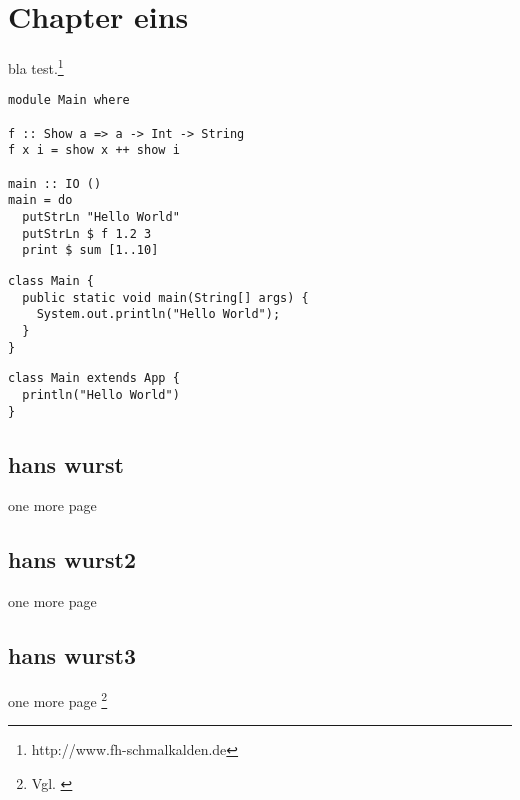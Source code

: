 \chapter{Chapter eins}
bla test.\footnote{http://www.fh-schmalkalden.de}

\begin{lstlisting}[label=listinghaskell,caption=This is Haskell]
module Main where

f :: Show a => a -> Int -> String
f x i = show x ++ show i

main :: IO ()
main = do
  putStrLn "Hello World"
  putStrLn $ f 1.2 3
  print $ sum [1..10]
\end{lstlisting}

\begin{lstlisting}[label=listingjava,caption=This is \gls{glo:Java}]
class Main {
  public static void main(String[] args) {
    System.out.println("Hello World");
  }
}
\end{lstlisting}

\begin{lstlisting}[label=listingscala,caption=This is Scala]
class Main extends App {
  println("Hello World")
}
\end{lstlisting}
\section{hans wurst}
one more page

\newpage
\section{hans wurst2}
one more page

\newpage
\section{hans wurst3}
one more page \footnote{Vgl. \cite{braun:scala}}

